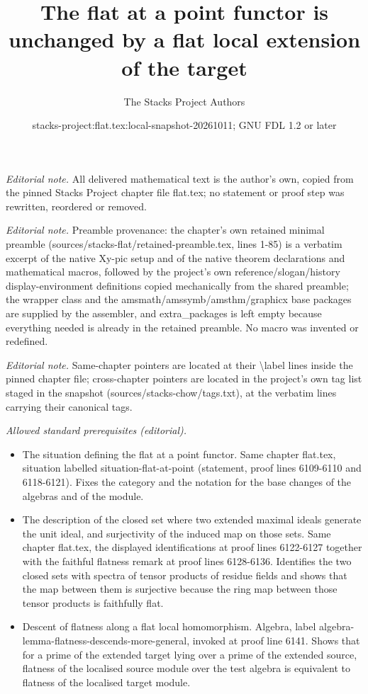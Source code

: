 \documentclass[10pt,a4paper]{amsart}
\title{The flat at a point functor is unchanged by a flat local extension of the target}
\author{The Stacks Project Authors}
\date{stacks-project:flat.tex:local-snapshot-20261011; GNU FDL 1.2 or later}
\theoremstyle{plain}
\theoremstyle{definition}
\theoremstyle{remark}
\numberwithin{equation}{subsection}
\begin{document}
\maketitle
\noindent\textit{Editorial note.} All delivered mathematical text is the author's own, copied from the pinned Stacks Project chapter file flat.tex; no statement or proof step was rewritten, reordered or removed.\par\medskip
\noindent\textit{Editorial note.} Preamble provenance: the chapter's own retained minimal preamble (sources/stacks-flat/retained-preamble.tex, lines 1-85) is a verbatim excerpt of the native Xy-pic setup and of the native theorem declarations and mathematical macros, followed by the project's own reference/slogan/history display-environment definitions copied mechanically from the shared preamble; the wrapper class and the amsmath/amssymb/amsthm/graphicx base packages are supplied by the assembler, and extra\_packages is left empty because everything needed is already in the retained preamble. No macro was invented or redefined.\par\medskip
\noindent\textit{Editorial note.} Same-chapter pointers are located at their \textbackslash{}label lines inside the pinned chapter file; cross-chapter pointers are located in the project's own tag list staged in the snapshot (sources/stacks-chow/tags.txt), at the verbatim lines carrying their canonical tags.\par\medskip
\noindent\textit{Allowed standard prerequisites (editorial).}\begin{itemize}
\item The situation defining the flat at a point functor. Same chapter flat.tex, situation labelled situation-flat-at-point (statement, proof lines 6109-6110 and 6118-6121). Fixes the category and the notation for the base changes of the algebras and of the module.
\item The description of the closed set where two extended maximal ideals generate the unit ideal, and surjectivity of the induced map on those sets. Same chapter flat.tex, the displayed identifications at proof lines 6122-6127 together with the faithful flatness remark at proof lines 6128-6136. Identifies the two closed sets with spectra of tensor products of residue fields and shows that the map between them is surjective because the ring map between those tensor products is faithfully flat.
\item Descent of flatness along a flat local homomorphism. Algebra, label algebra-lemma-flatness-descends-more-general, invoked at proof line 6141. Shows that for a prime of the extended target lying over a prime of the extended source, flatness of the localised source module over the test algebra is equivalent to flatness of the localised target module.
\end{itemize}\medskip
\end{document}
